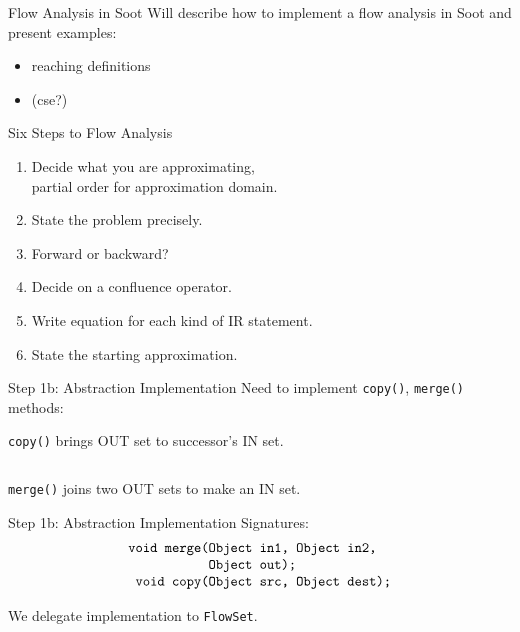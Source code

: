 \begin{slide}{Flow Analysis in Soot}
Will describe how to implement a flow analysis in Soot and present examples:
\begin{itemize}
\item reaching definitions
\item (cse?)
\end{itemize}
\end{slide}


\begin{slide}{Six Steps to Flow Analysis}
\begin{enumerate}
\item Decide what you are approximating,\\ partial order for approximation domain.

\item State the problem precisely.

\item Forward or backward?

\item Decide on a confluence operator.

\item Write equation for each kind of IR statement.

\item State the starting approximation.
\end{enumerate}
\end{slide}


\begin{slide}{Step 1b: Abstraction Implementation}
Need to implement {\tt copy()}, {\tt merge()} methods:
\begin{center}

\end{center}
{\tt copy()} brings OUT set to successor's IN set.

$\qquad$

\begin{center}

\end{center}
{\tt merge()} joins two OUT sets to make an IN set.
\end{slide}

\begin{slide}{Step 1b: Abstraction Implementation}
Signatures:
{\small 
\[ \mbox{\tt \begin{tabular}{r@{}l}
                 void merge(&Object in1, Object in2,\\
                            &Object out);\\
                 void copy(&Object src, Object dest);
\end{tabular}}\]
}

We delegate implementation to {\tt FlowSet}.
\end{slide}

